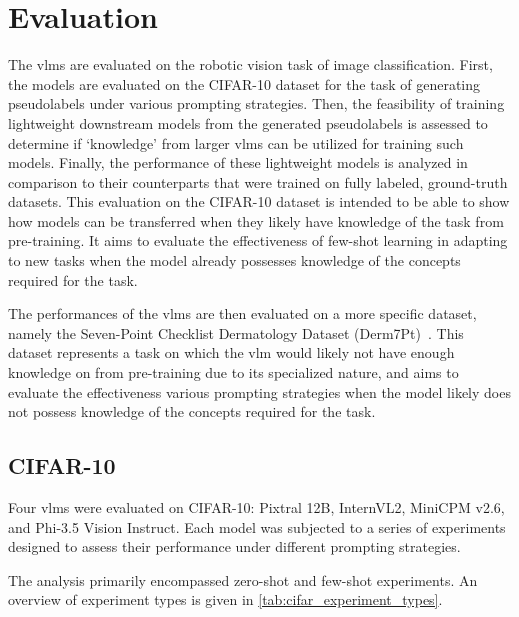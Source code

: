 \documentclass[../ShajiS_RnDReport.tex]{subfiles}
\begin{document}
\section{Evaluation}
\label{sec:evaluation}

The \glspl{vlm} are evaluated on the robotic vision task of image classification. First, the models are evaluated on the CIFAR-10 dataset for the task of generating pseudolabels under various prompting strategies. Then, the feasibility of training lightweight downstream models from the generated pseudolabels is assessed to determine if `knowledge' from larger \glspl{vlm} can be utilized for training such models. Finally, the performance of these lightweight models is analyzed in comparison to their counterparts that were trained on fully labeled, ground-truth datasets. This evaluation on the CIFAR-10 dataset is intended to be able to show how models can be transferred when they likely have knowledge of the task from pre-training. It aims to evaluate the effectiveness of few-shot learning in adapting to new tasks when the model already possesses knowledge of the concepts required for the task.

The performances of the \glspl{vlm} are then evaluated on a more specific dataset, namely the Seven-Point Checklist Dermatology Dataset (Derm7Pt)~\cite{Kawahara2019}. This dataset represents a task on which the \gls{vlm} would likely not have enough knowledge on from pre-training due to its specialized nature, and aims to evaluate the effectiveness various prompting strategies when the model likely does not possess knowledge of the concepts required for the task.

\subsection{CIFAR-10}
\label{subsec:evaluation:cifar10}
Four \glspl{vlm} were evaluated on CIFAR-10: Pixtral 12B, InternVL2, MiniCPM v2.6, and Phi-3.5 Vision Instruct. Each model was subjected to a series of experiments designed to assess their performance under different prompting strategies.

The analysis primarily encompassed zero-shot and few-shot experiments. An overview of experiment types is given in \autoref{tab:cifar_experiment_types}.
\end{document}
